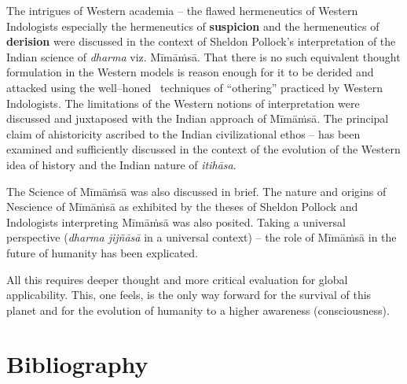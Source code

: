 The intrigues of Western academia – the flawed hermeneutics of Western Indologists especially the hermeneutics of \textbf{suspicion} and the hermeneutics of \textbf{derision} were discussed in the context of Sheldon Pollock’s interpretation of the Indian science of \textit{dharma} viz. Mīmāṁsā. That there is no such equivalent thought formulation in the Western models is reason enough for it to be derided and attacked using the well–honed  techniques of “othering” practiced by Western Indologists. The limitations of the Western notions of interpretation were discussed and juxtaposed with the Indian approach of Mīmāṁsā. The principal claim of ahistoricity ascribed to the Indian civilizational ethos – has been examined and sufficiently discussed in the context of the evolution of the Western idea of history and the Indian nature of \textit{itihāsa}.

The Science of Mīmāṁsā was also discussed in brief. The nature and origins of Nescience of Mīmāṁsā as exhibited by the theses of Sheldon Pollock and Indologists interpreting Mīmāṁsā was also posited. Taking a universal perspective (\textit{dharma jijñāsā} in a universal context) – the role of Mīmāṁsā in the future of humanity has been explicated.

All this requires deeper thought and more critical evaluation for global applicability. This, one feels, is the only way forward for the survival of this planet and for the evolution of humanity to a higher awareness (consciousness).


\section*{Bibliography}

